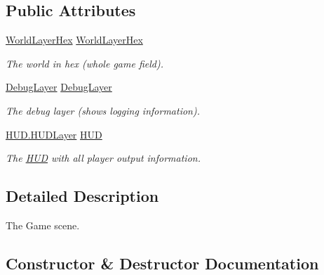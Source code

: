 \subsection*{Public Attributes}
\begin{DoxyCompactItemize}
\item 
\hyperlink{classClient_1_1Common_1_1Views_1_1WorldLayerHex}{World\+Layer\+Hex} \hyperlink{classClient_1_1Common_1_1Views_1_1GameScene_af3de419dcf8598986518a62b075b915a}{World\+Layer\+Hex}
\begin{DoxyCompactList}\small\item\em The world in hex (whole game field). \end{DoxyCompactList}\item 
\hyperlink{classClient_1_1Common_1_1Views_1_1DebugLayer}{Debug\+Layer} \hyperlink{classClient_1_1Common_1_1Views_1_1GameScene_a69368b2f72d335939becb41659748957}{Debug\+Layer}
\begin{DoxyCompactList}\small\item\em The debug layer (shows logging information). \end{DoxyCompactList}\item 
\hyperlink{classClient_1_1Common_1_1Views_1_1HUD_1_1HUDLayer}{H\+U\+D.\+H\+U\+D\+Layer} \hyperlink{classClient_1_1Common_1_1Views_1_1GameScene_a258d6926c69733c7113ed83bd4c6940f}{H\+U\+D}
\begin{DoxyCompactList}\small\item\em The \hyperlink{namespaceClient_1_1Common_1_1Views_1_1HUD}{H\+U\+D} with all player output information. \end{DoxyCompactList}\end{DoxyCompactItemize}


\subsection{Detailed Description}
The Game scene. 



\subsection{Constructor \& Destructor Documentation}
\hypertarget{classClient_1_1Common_1_1Views_1_1GameScene_a946494de04b027e43b5d2229cc780f7e}{}

